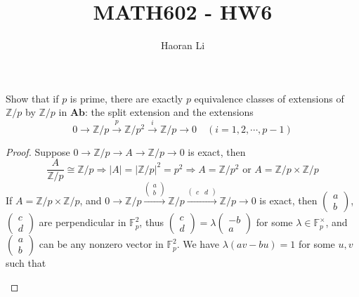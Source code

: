 \documentclass{article}
\title{MATH602 - HW6}
\author{Haoran Li}
\date{}
\newenvironment{exercise}[2][Exercise]{\begin{trivlist}
\item[\hskip \labelsep {\bfseries #1}\hskip \labelsep {\bfseries #2.}]}{\end{trivlist}}
\theoremstyle{definition}
\theoremstyle{remark}
\theoremstyle{definition}
\begin{document}
\sloppy %

\maketitle
\begin{exercise}{\textbf{3.4.1}}
Show that if $p$ is prime, there are exactly $p$ equivalence classes of extensions of $\mathbb Z/p$ by $\mathbb Z/p$ in $\mathbf {Ab}$: the split extension and the extensions
\[0\to\mathbb Z/p\xrightarrow{p}\mathbb Z/p^2\xrightarrow i\mathbb Z/p\to0\quad(i=1,2,\cdots,p-1)\]
\end{exercise}

\begin{proof}
Suppose $0\to\mathbb Z/p\to A\to\mathbb Z/p\to0$ is exact, then
\[\dfrac{A}{\mathbb Z/p}\cong\mathbb Z/p\Rightarrow|A|=|\mathbb Z/p|^2=p^2\Rightarrow A=\mathbb Z/p^2\text{ or }A=\mathbb Z/p\times\mathbb Z/p\]
If $A=\mathbb Z/p\times\mathbb Z/p$, and $0\to\mathbb Z/p\xrightarrow{\begin{pmatrix}
a \\
b
\end{pmatrix}}\mathbb Z/p\xrightarrow{\begin{pmatrix}
c&d
\end{pmatrix}}\mathbb Z/p\to 0$ is exact, then $\begin{pmatrix}
a \\
b
\end{pmatrix}$, $\begin{pmatrix}
c \\
d
\end{pmatrix}$ are perpendicular in $\mathbb F_p^2$, thus $\begin{pmatrix}
c \\
d
\end{pmatrix}=\lambda\begin{pmatrix}
-b \\
a
\end{pmatrix}$ for some $\lambda\in\mathbb F_p^\times$, and $\begin{pmatrix}
a \\
b
\end{pmatrix}$ can be any nonzero vector in $\mathbb F_p^2$. We have $\lambda(av-bu)=1$ for some $u,v$ such that
\begin{center}
\end{center}
\end{proof}
\end{document}

